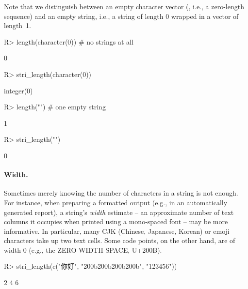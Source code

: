 \documentclass[nojss]{jss}
\begin{document}
\noindent
Note that we distinguish between an empty character vector
(, i.e., a zero-length sequence)
and an empty string, i.e., a string of length 0 wrapped in a vector
of length~1.

\begin{Schunk}
\begin{Sinput}
R> length(character(0))      # no strings at all
\end{Sinput}
\begin{Soutput}
[1] 0
\end{Soutput}
\begin{Sinput}
R> stri_length(character(0))
\end{Sinput}
\begin{Soutput}
integer(0)
\end{Soutput}
\begin{Sinput}
R> length("")                # one empty string
\end{Sinput}
\begin{Soutput}
[1] 1
\end{Soutput}
\begin{Sinput}
R> stri_length("")
\end{Sinput}
\begin{Soutput}
[1] 0
\end{Soutput}
\end{Schunk}


\paragraph{Width.}
Sometimes merely knowing  the number of characters in a string is not enough.
For instance, when preparing a formatted output (e.g., in an automatically
generated report),
a string's \textit{width} estimate -- an approximate number of text columns
it occupies when printed using a mono-spaced font -- may be more informative.
In particular, many CJK (Chinese, Japanese, Korean) or emoji
characters take up two text cells. Some code points, on the other hand,
are of width 0 (e.g., the ZERO WIDTH SPACE, U+200B).



\begin{Schunk}
\begin{Sinput}
R> stri_length(c("你好", "\u200b\u200b\u200b\u200b", "123456"))
\end{Sinput}
\begin{Soutput}
[1] 2 4 6
\end{Soutput}
\end{Schunk}
\end{document}

